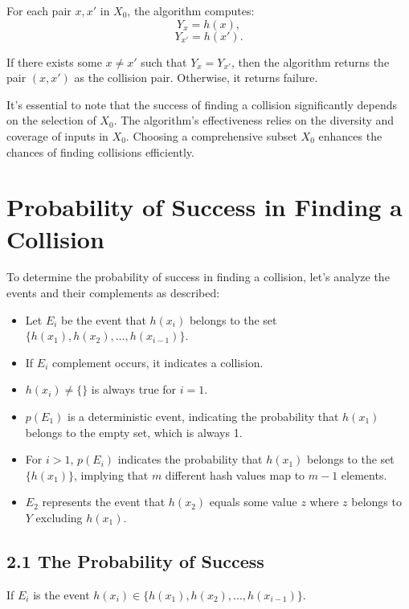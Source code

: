 \documentclass[11pt]{article}
\begin{document}
For each pair \( x, x' \) in \( X_0 \), the algorithm computes:
\[ Y_x = h(x), \]
\[ Y_{x'} = h(x'). \]

If there exists some \( x \neq x' \) such that \( Y_x = Y_{x'} \), then the algorithm returns the pair \( (x, x') \) as the collision pair. Otherwise, it returns failure.

It's essential to note that the success of finding a collision significantly depends on the selection of \( X_0 \). The algorithm's effectiveness relies on the diversity and coverage of inputs in \( X_0 \). Choosing a comprehensive subset \( X_0 \) enhances the chances of finding collisions efficiently.

\section*{Probability of Success in Finding a Collision}

To determine the probability of success in finding a collision, let's analyze the events and their complements as described:

\begin{itemize}
    \item Let \( E_i \) be the event that \( h(x_i) \) belongs to the set \( \{ h(x_1), h(x_2), \ldots, h(x_{i-1}) \} \).
    \item If \( E_i \) complement occurs, it indicates a collision.
    \item \( h(x_i) \neq \{\} \) is always true for \( i = 1 \).
    \item \( p(E_1) \) is a deterministic event, indicating the probability that \( h(x_1) \) belongs to the empty set, which is always 1.
    \item For \( i > 1 \), \( p(E_i) \) indicates the probability that \( h(x_1) \) belongs to the set \( \{ h(x_1) \} \), implying that \( m \) different hash values map to \( m - 1 \) elements.
    \item \( E_2 \) represents the event that \( h(x_2) \) equals some value \( z \) where \( z \) belongs to \( Y \) excluding \( h(x_1) \).
\end{itemize}






\subsection*{2.1 The Probability of Success}

If \( E_i \) is the event \( h(x_i) \in \{h(x_1), h(x_2), \ldots, h(x_{i-1})\} \).
\end{document}
